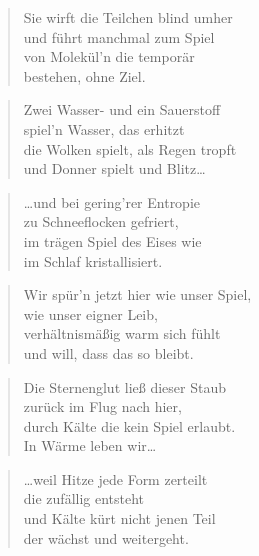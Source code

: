 \documentclass[10pt,a4paper]{article}
\begin{document}
\begin{multicols}{2}
\begin{verse}
Sie wirft die Teilchen blind umher \\
und führt manchmal zum Spiel \\
von Molekül’n die temporär \\
bestehen, ohne Ziel. \\
\end{verse}

\begin{verse}
Zwei Wasser- und ein Sauerstoff \\
spiel’n Wasser, das erhitzt \\
die Wolken spielt, als Regen tropft \\
und Donner spielt und Blitz… \\
\end{verse}

\begin{verse}
…und bei gering’rer Entropie \\
zu Schneeflocken gefriert, \\
im trägen Spiel des Eises wie \\
im Schlaf kristallisiert. \\
\end{verse}

\begin{verse}
Wir spür’n jetzt hier wie unser Spiel, \\
wie unser eigner Leib, \\
verhältnismäßig warm sich fühlt \\
und will, dass das so bleibt. \\
\end{verse}

\begin{verse}
Die Sternenglut ließ dieser Staub \\
zurück im Flug nach hier, \\
durch Kälte die kein Spiel erlaubt. \\
In Wärme leben wir… \\
\end{verse}

\begin{verse}
…weil Hitze jede Form zerteilt \\
die zufällig entsteht \\
und Kälte kürt nicht jenen Teil \\
der wächst und weitergeht. \\
\end{verse}


\end{multicols}
\end{document}
